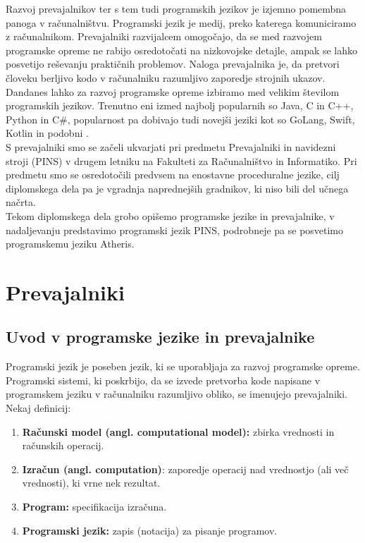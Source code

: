 \documentclass[a4paper, 12p]{book}
\begin{document}
Razvoj prevajalnikov ter s tem tudi programskih jezikov je izjemno pomembna panoga v računalništvu. Programski jezik je medij, preko katerega komuniciramo z računalnikom. Prevajalniki razvijalcem omogočajo, da se med razvojem programske opreme ne rabijo osredotočati na nizkovojske detajle, ampak se lahko posvetijo reševanju praktičnih problemov. Naloga prevajalnika je, da pretvori človeku berljivo kodo v računalniku razumljivo zaporedje strojnih ukazov. \\
\indent Dandanes lahko za razvoj programske opreme izbiramo med velikim številom programskih jezikov. Trenutno eni izmed najbolj popularnih so Java, C in C++, Python in C\#, popularnost pa dobivajo tudi novejši jeziki kot so GoLang, Swift, Kotlin in podobni \cite{tiobeIndex}. \\
\indent S prevajalniki smo se začeli ukvarjati pri predmetu Prevajalniki in navidezni stroji (PINS) v drugem letniku na Fakulteti za Računalništvo in Informatiko. Pri predmetu smo se osredotočili predvsem na enostavne proceduralne jezike, cilj diplomskega dela pa je vgradnja naprednejših gradnikov, ki niso bili del učnega načrta. \\
\indent Tekom diplomskega dela grobo opišemo programske jezike in prevajalnike, v nadaljevanju predstavimo programski jezik PINS, podrobneje pa se posvetimo programskemu jeziku Atheris.

\chapter{Prevajalniki}
\label{ch0}

\section{Uvod v  programske jezike in prevajalnike}

Programski jezik je poseben jezik, ki se uporabljaja za razvoj programske opreme. Programski sistemi, ki poskrbijo, da se izvede pretvorba kode napisane v programskem jeziku v računalniku razumljivo obliko, se imenujejo prevajalniki. \\
Nekaj definicij:
\begin{enumerate}  
	\item \textbf{Računski model (angl. computational model):} zbirka vrednosti in računskih operacij.
	\item \textbf{Izračun (angl. computation)}: zaporedje operacij nad vrednostjo (ali več vrednosti), ki vrne nek rezultat.
	\item \textbf{Program:} specifikacija izračuna.
	\item \textbf{Programski jezik:} zapis (notacija) za pisanje programov.
\end{enumerate}
\end{document}
